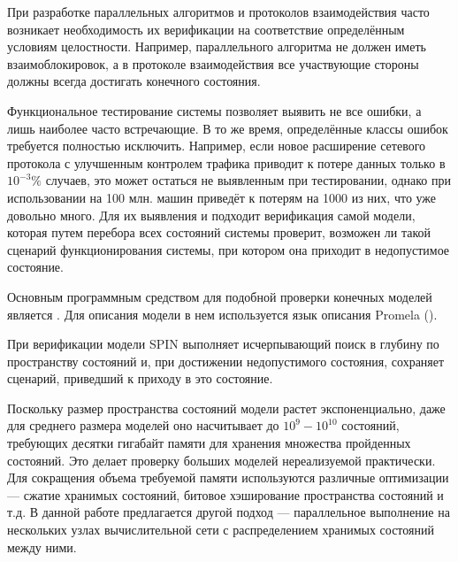 \Introduction

При разработке параллельных алгоритмов и протоколов взаимодействия
часто возникает необходимость их верификации на соответствие
определённым условиям целостности. Например, параллельного алгоритма
не должен иметь взаимоблокировок, а в протоколе взаимодействия все
участвующие стороны должны всегда достигать конечного состояния.

Функциональное тестирование системы позволяет выявить не все ошибки, а
лишь наиболее часто встречающие. В то же время, определённые классы
ошибок требуется полностью исключить. Например, если новое расширение
сетевого протокола с улучшенным контролем трафика приводит к потере
данных только в $10^{-3}\%$ случаев, это может остаться не выявленным при
тестировании, однако при использовании на 100 млн. машин приведёт к
потерям на 1000 из них, что уже довольно много. Для их выявления и
подходит верификация самой модели, которая путем перебора всех
состояний системы проверит, возможен ли такой сценарий
функционирования системы, при котором она приходит в недопустимое
состояние.

Основным программным средством для подобной проверки конечных моделей
является . Для описания модели в нем используется язык описания
Promela (). 

При верификации модели SPIN выполняет исчерпывающий поиск в глубину по
пространству состояний и, при достижении недопустимого состояния,
сохраняет сценарий, приведший к приходу в это состояние.

Поскольку размер пространства состояний модели растет экспоненциально,
даже для среднего размера моделей оно насчитывает до $10^9 - 10^{10}$
состояний, требующих десятки гигабайт памяти для хранения множества
пройденных состояний. Это делает проверку больших моделей
нереализуемой практически. Для сокращения объема требуемой памяти
используются различные оптимизации — сжатие хранимых состояний,
битовое хэширование пространства состояний и т.д. В
данной работе предлагается другой подход — параллельное выполнение на
нескольких узлах вычислительной сети с распределением хранимых
состояний между ними.

